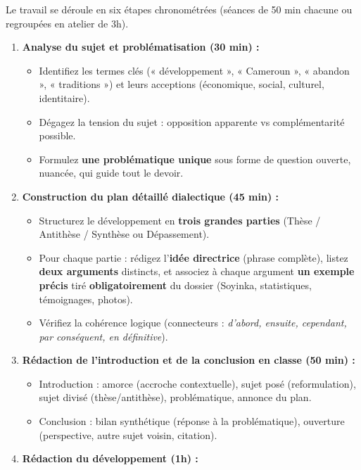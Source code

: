 \documentclass[11pt]{article}
\newcounter{popsec}
\newcounter{popsub}
\newcommand{\courssub}[1]{%
  \stepcounter{popsub}%
  \par\vspace{9pt}\noindent{\popxbold\fontsize{11.5}{13}\selectfont\color{popink}{\color{poporange}\thepopsec.\thepopsub}\hspace{6pt}#1}\par\nopagebreak\vspace{4pt}
}
\begin{document}
\courssub{Consignes}
Le travail se déroule en six étapes chronométrées (séances de 50 min chacune ou regroupées en atelier de 3h).

\begin{enumerate}
    \item \textbf{Analyse du sujet et problématisation (30 min) :} 
    \begin{itemize}
        \item Identifiez les termes clés (« développement », « Cameroun », « abandon », « traditions ») et leurs acceptions (économique, social, culturel, identitaire).
        \item Dégagez la tension du sujet : opposition apparente vs complémentarité possible.
        \item Formulez \textbf{une problématique unique} sous forme de question ouverte, nuancée, qui guide tout le devoir.
    \end{itemize}
    \item \textbf{Construction du plan détaillé dialectique (45 min) :} 
    \begin{itemize}
        \item Structurez le développement en \textbf{trois grandes parties} (Thèse / Antithèse / Synthèse ou Dépassement).
        \item Pour chaque partie : rédigez l'\textbf{idée directrice} (phrase complète), listez \textbf{deux arguments} distincts, et associez à chaque argument \textbf{un exemple précis} tiré \textbf{obligatoirement} du dossier (Soyinka, statistiques, témoignages, photos).
        \item Vérifiez la cohérence logique (connecteurs : \emph{d'abord, ensuite, cependant, par conséquent, en définitive}).
    \end{itemize}
    \item \textbf{Rédaction de l'introduction et de la conclusion en classe (50 min) :} 
    \begin{itemize}
        \item Introduction : amorce (accroche contextuelle), sujet posé (reformulation), sujet divisé (thèse/antithèse), problématique, annonce du plan.
        \item Conclusion : bilan synthétique (réponse à la problématique), ouverture (perspective, autre sujet voisin, citation).
    \end{itemize}
    \item \textbf{Rédaction du développement (1h) :} 
    \begin{itemize}

\end{itemize}
\end{enumerate}
\end{document}
